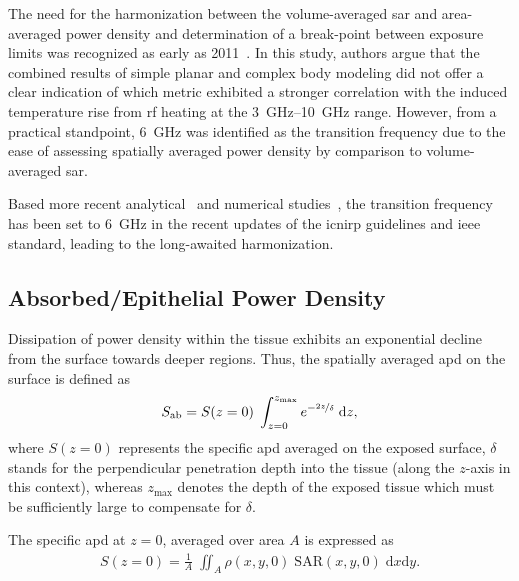 The need for the harmonization between the volume-averaged \gls{sar} and area-averaged power density and determination of a break-point between exposure limits was recognized as early as 2011~\cite{McIntosh2011SAR}.
In this study, authors argue that the combined results of simple planar and complex body modeling did not offer a clear indication of which metric exhibited a stronger correlation with the induced temperature rise from \gls{rf} heating at the \SIrange{3}{10}{\GHz} range.
However, from a practical standpoint, \SI{6}{\GHz} was identified as the transition frequency due to the ease of assessing spatially averaged power density by comparison to volume-averaged \gls{sar}.

Based more recent analytical~\cite{Foster2016Thermal,Foster2017Thermal,Ziskin2018Tissue} and numerical studies~\cite{Hirata2019Setting}, the transition frequency has been set to \SI{6}{\GHz} in the recent updates of the \gls{icnirp} guidelines and \gls{ieee} standard, leading to the long-awaited harmonization.

\subsection{Absorbed/Epithelial Power Density}
Dissipation of power density within the tissue exhibits an exponential decline from the surface towards deeper regions.
Thus, the spatially averaged \gls{apd} on the surface is defined as
\begin{align}
    \label{eqn:apd}
    S_\text{ab} = S(z=0) \; \int_{z=0}^{z_\text{max}} e^{ -\nicefrac{2z}{\delta}} \; \mathrm{d}z,
\end{align}
where $S(z=0)$ represents the specific \gls{apd} averaged on the exposed surface, $\delta$ stands for the perpendicular penetration depth into the tissue (along the $z$-axis in this context), whereas $z_\text{max}$ denotes the depth of the exposed tissue which must be sufficiently large to compensate for $\delta$.

The specific \gls{apd} at $z=0$, averaged over area $A$ is expressed as
\begin{align}
    \label{eqn:specific_apd}
    S(z=0) = \frac{1}{A} \; \iint_A \rho(x, y, 0) \; \text{SAR}(x, y, 0) \; \mathrm{d}x \mathrm{d}y.
\end{align}

